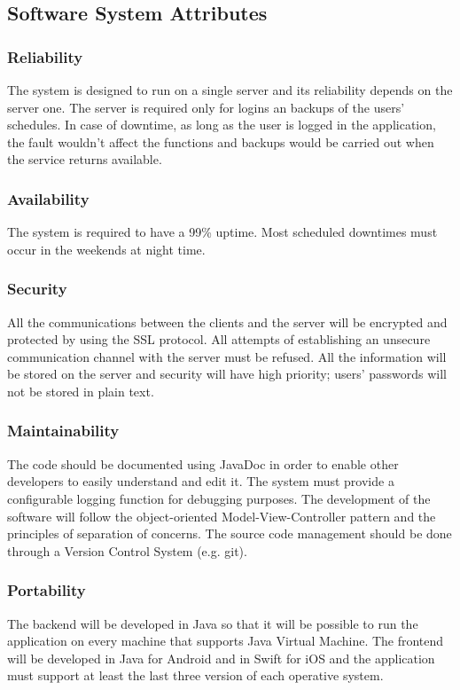 \subsection{Software System Attributes}
\subsubsection{Reliability}
The system is designed to run on a single server and its reliability depends on the server one. The server is required only for logins an backups of the users’ schedules.
In case of downtime, as long as the user is logged in the application, the fault wouldn’t affect the functions and backups would be carried out when the service returns available.

\subsubsection{Availability}
The system is required to have a 99\% uptime. Most scheduled downtimes must occur in the weekends at night time.

\subsubsection{Security}
All the communications between the clients and the server will be encrypted and protected by using the SSL protocol. All attempts of establishing an unsecure communication channel with the server must be refused.
All the information will be stored on the server and security will have high priority; users’ passwords will not be stored in plain text.

\subsubsection{Maintainability}
The code should be documented using JavaDoc in order to enable other developers to easily understand and edit it. The system must provide a configurable logging function for debugging purposes. The development of the software will follow the object-oriented Model-View-Controller pattern and the principles of separation of concerns. The source code management should be done through a Version Control System (e.g. git).

\subsubsection{Portability}
The backend will be developed in Java so that it will be possible to run the application on every machine that supports Java Virtual Machine.
The frontend will be developed in Java for Android and in Swift for iOS and the application must support at least the last three version of each operative system.


